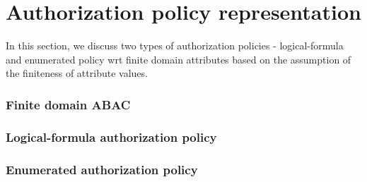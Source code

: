 
\section{Authorization policy representation}

\label{sec:background}
In this section, we discuss two types of authorization policies - logical-formula and enumerated policy wrt finite domain attributes based on the assumption of the finiteness of attribute values. 
\subsubsection{Finite domain ABAC}
	

\vspace{-.5em}
\subsubsection{Logical-formula authorization policy}



\subsubsection{Enumerated authorization policy}
	




